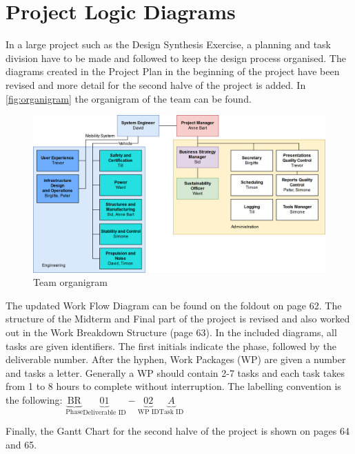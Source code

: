 \newpage
\chapter{Project Logic Diagrams}
\label{ch-diagrams}

In a large project such as the Design Synthesis Exercise, a planning and task division have to be made and followed to keep the design process organised. The diagrams created in the Project Plan in the beginning of the project have been revised and more detail for the second halve of the project is added. In \autoref{fig:organigram} the organigram of the team can be found. 



\begin{figure}[h]
    \centering
    \includegraphics[width=0.9\linewidth]{Figures/organigram.png}
    \captionsetup{justification=centering}
    \caption{Team organigram}
    \label{fig:organigram}
\end{figure}



The updated Work Flow Diagram can be found on the foldout on page 62. The structure of the Midterm and Final part of the project is revised and also worked out in the Work Breakdown Structure (page 63). In the included diagrams, all tasks are given identifiers. The first initials indicate the phase, followed by the deliverable number. After the hyphen, Work Packages (WP) are given a number and tasks a letter. Generally a WP should contain 2-7 tasks and each task takes from 1 to 8 hours to complete without interruption. The labelling convention is the following: $\underbrace{\text{BR}}_\text{Phase}\underbrace{01}_\text{Deliverable ID}-\underbrace{02}_\text{WP ID}\underbrace{A}_\text{Task ID}$ 

Finally, the Gantt Chart for the second halve of the project is shown on pages 64 and 65.





